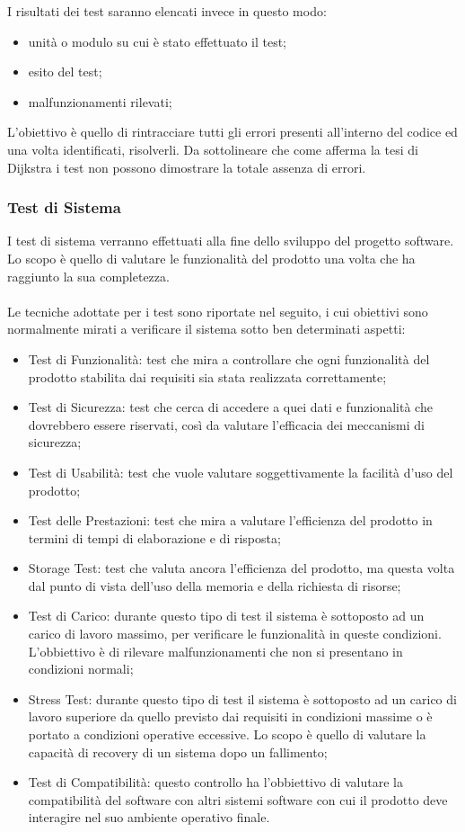 I risultati dei test saranno elencati invece in questo modo:
\begin{itemize}
  \item unit\`a o modulo su cui \`e stato effettuato il test;
  \item esito del test;
  \item malfunzionamenti rilevati;
\end{itemize}

L'obiettivo \`e quello di rintracciare tutti gli errori presenti all'interno del
codice ed una volta identificati, risolverli. Da sottolineare che come afferma la tesi di Dijkstra 
i test non possono dimostrare la totale assenza di errori.

\subsubsection*{Test di Sistema}
I test di sistema verranno effettuati alla fine dello sviluppo del progetto
software. Lo scopo \`e quello di valutare le funzionalit\`a del prodotto una volta 
che ha raggiunto la sua completezza.\\ \\ 
Le tecniche adottate per i test sono riportate nel seguito, i cui obiettivi sono 
normalmente mirati a verificare il sistema sotto ben determinati aspetti:

\begin{itemize}
  \item Test di Funzionalit\`a: test che mira a controllare che ogni
  funzionalit\`a del prodotto stabilita dai requisiti sia stata realizzata correttamente;
  \item Test di Sicurezza: test che cerca di accedere a quei dati e
  funzionalit\`a che dovrebbero essere riservati, cos\`i da valutare l'efficacia dei meccanismi di sicurezza;
  \item Test di Usabilit\`a:  test che vuole valutare soggettivamente la facilit\`a
  d'uso del prodotto;
  \item Test delle Prestazioni: test che mira a valutare l'efficienza del
  prodotto in termini di tempi di elaborazione e di risposta;
  \item Storage Test: test che valuta ancora l'efficienza del
  prodotto, ma questa volta dal punto di vista dell'uso della memoria e della
  richiesta di risorse;
  \item Test di Carico: durante questo tipo di test il sistema \`e sottoposto ad
  un carico di lavoro massimo, per verificare le funzionalit\`a in queste
  condizioni. L'obbiettivo \`e di rilevare malfunzionamenti che non si presentano in condizioni normali;
  \item Stress Test: durante questo tipo di test il sistema \`e sottoposto ad un
  carico di lavoro superiore da quello previsto dai requisiti in condizioni
  massime o \`e portato a condizioni operative eccessive. Lo scopo \`e quello di valutare la capacit\`a di recovery di un sistema dopo un fallimento;
  \item Test di Compatibilit\`a: questo controllo ha l'obbiettivo di valutare la
  compatibilit\`a del software con altri sistemi software con cui il prodotto deve interagire nel suo ambiente operativo finale.
 \end{itemize}


